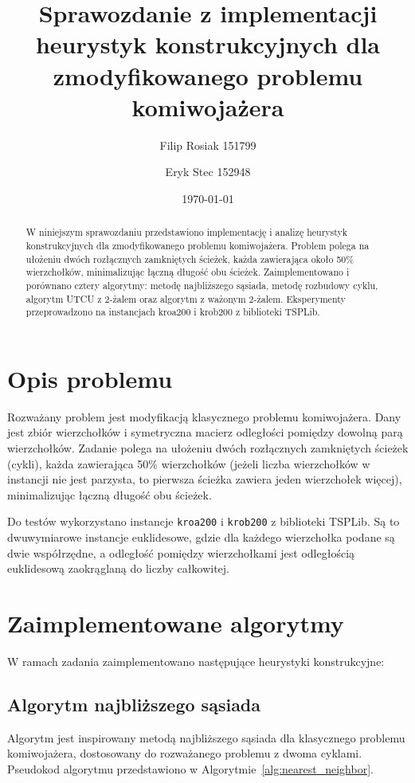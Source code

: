 \documentclass[12pt,a4paper]{article}
\title{Sprawozdanie z implementacji heurystyk konstrukcyjnych dla zmodyfikowanego problemu komiwojażera}
\author{Filip Rosiak 151799  \and Eryk Stec 152948}
\date{\today}
\begin{document}
\maketitle

\begin{abstract}
W niniejszym sprawozdaniu przedstawiono implementację i analizę heurystyk konstrukcyjnych dla zmodyfikowanego problemu komiwojażera. Problem polega na ułożeniu dwóch rozłącznych zamkniętych ścieżek, każda zawierająca około 50\% wierzchołków, minimalizując łączną długość obu ścieżek. Zaimplementowano i porównano cztery algorytmy: metodę najbliższego sąsiada, metodę rozbudowy cyklu, algorytm UTCU z 2-żalem oraz algorytm z ważonym 2-żalem. Eksperymenty przeprowadzono na instancjach kroa200 i krob200 z biblioteki TSPLib.
\end{abstract}

\section{Opis problemu}
Rozważany problem jest modyfikacją klasycznego problemu komiwojażera. Dany jest zbiór wierzchołków i symetryczna macierz odległości pomiędzy dowolną parą wierzchołków. Zadanie polega na ułożeniu dwóch rozłącznych zamkniętych ścieżek (cykli), każda zawierająca 50\% wierzchołków (jeżeli liczba wierzchołków w instancji nie jest parzysta, to pierwsza ścieżka zawiera jeden wierzchołek więcej), minimalizując łączną długość obu ścieżek.

Do testów wykorzystano instancje \texttt{kroa200} i \texttt{krob200} z biblioteki TSPLib. Są to dwuwymiarowe instancje euklidesowe, gdzie dla każdego wierzchołka podane są dwie współrzędne, a odległość pomiędzy wierzchołkami jest odległością euklidesową zaokrąglaną do liczby całkowitej.

\section{Zaimplementowane algorytmy}
W ramach zadania zaimplementowano następujące heurystyki konstrukcyjne:

\subsection{Algorytm najbliższego sąsiada}
Algorytm jest inspirowany metodą najbliższego sąsiada dla klasycznego problemu komiwojażera, dostosowany do rozważanego problemu z dwoma cyklami. Pseudokod algorytmu przedstawiono w Algorytmie~\ref{alg:nearest_neighbor}.
\end{document}
